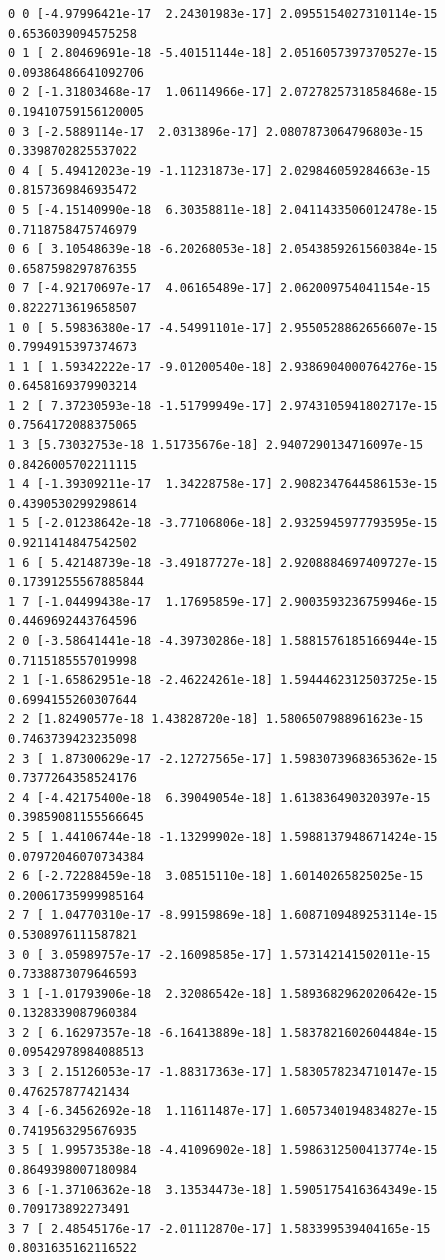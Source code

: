 \documentclass[11pt]{article}
\begin{document}
    \begin{Verbatim}[commandchars=\\\{\}]
0 0 [-4.97996421e-17  2.24301983e-17] 2.0955154027310114e-15 0.6536039094575258
0 1 [ 2.80469691e-18 -5.40151144e-18] 2.0516057397370527e-15 0.09386486641092706
0 2 [-1.31803468e-17  1.06114966e-17] 2.0727825731858468e-15 0.19410759156120005
0 3 [-2.5889114e-17  2.0313896e-17] 2.0807873064796803e-15 0.3398702825537022
0 4 [ 5.49412023e-19 -1.11231873e-17] 2.029846059284663e-15 0.8157369846935472
0 5 [-4.15140990e-18  6.30358811e-18] 2.0411433506012478e-15 0.7118758475746979
0 6 [ 3.10548639e-18 -6.20268053e-18] 2.0543859261560384e-15 0.6587598297876355
0 7 [-4.92170697e-17  4.06165489e-17] 2.062009754041154e-15 0.8222713619658507
1 0 [ 5.59836380e-17 -4.54991101e-17] 2.9550528862656607e-15 0.7994915397374673
1 1 [ 1.59342222e-17 -9.01200540e-18] 2.9386904000764276e-15 0.6458169379903214
1 2 [ 7.37230593e-18 -1.51799949e-17] 2.9743105941802717e-15 0.7564172088375065
1 3 [5.73032753e-18 1.51735676e-18] 2.9407290134716097e-15 0.8426005702211115
1 4 [-1.39309211e-17  1.34228758e-17] 2.9082347644586153e-15 0.4390530299298614
1 5 [-2.01238642e-18 -3.77106806e-18] 2.9325945977793595e-15 0.9211414847542502
1 6 [ 5.42148739e-18 -3.49187727e-18] 2.9208884697409727e-15 0.17391255567885844
1 7 [-1.04499438e-17  1.17695859e-17] 2.9003593236759946e-15 0.4469692443764596
2 0 [-3.58641441e-18 -4.39730286e-18] 1.5881576185166944e-15 0.7115185557019998
2 1 [-1.65862951e-18 -2.46224261e-18] 1.5944462312503725e-15 0.6994155260307644
2 2 [1.82490577e-18 1.43828720e-18] 1.5806507988961623e-15 0.7463739423235098
2 3 [ 1.87300629e-17 -2.12727565e-17] 1.5983073968365362e-15 0.7377264358524176
2 4 [-4.42175400e-18  6.39049054e-18] 1.613836490320397e-15 0.39859081155566645
2 5 [ 1.44106744e-18 -1.13299902e-18] 1.5988137948671424e-15 0.07972046070734384
2 6 [-2.72288459e-18  3.08515110e-18] 1.60140265825025e-15 0.20061735999985164
2 7 [ 1.04770310e-17 -8.99159869e-18] 1.6087109489253114e-15 0.5308976111587821
3 0 [ 3.05989757e-17 -2.16098585e-17] 1.573142141502011e-15 0.7338873079646593
3 1 [-1.01793906e-18  2.32086542e-18] 1.5893682962020642e-15 0.1328339087960384
3 2 [ 6.16297357e-18 -6.16413889e-18] 1.5837821602604484e-15 0.09542978984088513
3 3 [ 2.15126053e-17 -1.88317363e-17] 1.5830578234710147e-15 0.476257877421434
3 4 [-6.34562692e-18  1.11611487e-17] 1.6057340194834827e-15 0.7419563295676935
3 5 [ 1.99573538e-18 -4.41096902e-18] 1.5986312500413774e-15 0.8649398007180984
3 6 [-1.37106362e-18  3.13534473e-18] 1.5905175416364349e-15 0.709173892273491
3 7 [ 2.48545176e-17 -2.01112870e-17] 1.583399539404165e-15 0.8031635162116522

\end{Verbatim}
\end{document}
